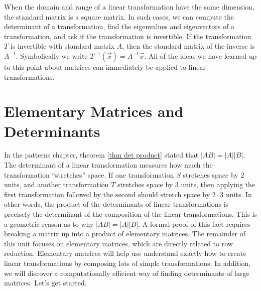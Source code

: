 When the domain and range of a linear transformation have the same dimension, the standard matrix is a square matrix.  
In such cases, we can compute the determinant of a transformation, find the eigenvalues and eigenvectors of a transformation, and ask if the transformation is invertible. 
If the transformation $T$ is invertible with standard matrix $A$, then the standard matrix of the inverse is $A^{-1}$. Symbolically we write $T^{-1}(\vec x) = A^{-1}\vec x$. 
All of the ideas we have learned up to this point about matrices can immediately be applied to linear transformations. 


\section{Elementary Matrices and Determinants}

In the patterns chapter, theorem \ref{thm det product} stated that $|AB|=|A||B|$. The determinant of a linear transformation measures how much the transformation ``stretches'' space. If one transformation $S$ stretches space by 2 units, and another transformation $T$ stretches space by $3$ units, then applying the first transformation followed by the second should stretch space by $2\cdot 3$ units. In other words, the product of the determinants of linear transformations is precisely the determinant of the composition of the linear transformations. This is a geometric reason as to why $|AB|=|A||B|$. 
A formal proof of this fact requires breaking a matrix up into a product of elementary matrices. 
The remainder of this unit focuses on elementary matrices, which are directly related to row reduction.  
Elementary matrices will help use understand exactly how to create linear transformations by composing lots of simple transformations. 
In addition, we will discover a computationally efficient way of finding determinants of large matrices.  
Let's get started.

